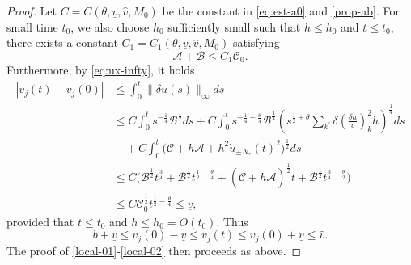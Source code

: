 \documentclass[a4paper,oneside,11pt]{article}
\numberwithin{equation}{section}
\begin{document}
\begin{proof}
Let \(C=C(\theta,\underline{v},\hat v,M_0)\) be the constant in \eqref{eq:est-a0}  and \eqref{prop-ab}. For small time $t_0$, we also choose \(h_{0}\) sufficiently small such that \(h\leq h_{0}\) and \(t\leq t_0\), there exists a constant $C_1=C_1(\theta,\underline{v},\hat v,M_0)$ satisfying
\[\mathscr{A}+\mathscr{B}\leq C_1\mathscr{C}_0.\]
Furthermore, by \eqref{eq:ux-infty}, it holds
\begin{equation}\label{eq:v-infty}
	\begin{aligned}
\left| {{v}_{j}\left( {t}\right)  - {v}_{j}\left( 0\right) }\right|  &\leq  \int_{0}^{{t}}\parallel {\delta u}\left( s\right) {\parallel }_{\infty }{ds}\\
&\leq  C\int_{0}^{t}  {s}^{-\frac{1}{4}}{\mathscr{B}}^{\frac{1}{2}}ds+C\int_{0}^{t}  {{s}^{-\frac{1}{4} - \frac{\theta }{4}}{\mathscr{B}}^{\frac{1}{4}}{\left( {s}^{\frac{1}{2} + \theta }\mathop{\sum }\limits_{k^{\prime}}\delta {\left( \frac{\delta u}{v}\right) }_{k}^{2}h\right) }^{\frac{1}{4}}}ds\\
&\quad +C\int_{0}^{t}\big(\tilde{\mathscr{C}}+ h\mathscr{A}+h^{2}\dot{u}_{\pm N_* }(t)^{2}\big)^{\frac12}ds\\
&\leq  C\Big({\mathscr{B}}^{\frac{1}{2}}{t}^{\frac{3}{4}}+  {\mathscr{B}}^{\frac{1}{2}}{t}^{\frac{1}{2} - \frac{\theta }{4}} + (\tilde{\mathscr{C}}+ h\mathscr{A})^{\frac{1}{2}}t+ {\mathscr{B}}^{\frac{1}{2}}{t}^{\frac{3}{4} - \frac{\theta }{2}} \Big)\\
&\leq  C{\mathscr{C}}_{0}^{\frac{1}{2}}t^{\frac{1}{2} - \frac{\theta }{4}}\leq \underline{v},
	\end{aligned}	
\end{equation}
provided that \(t\leq t_0\) and \(h\leq h_{0}=O(t_0)\). Thus
\begin{equation}\label{eq:v-infty1}
	b+\underline{v}\leq v_j(0)-\underline{v}\leq v_j(t)\leq v_j(0)+\underline{v}\leq \hat{v}.
\end{equation}
The proof of \eqref{local-01}-\eqref{local-02} then proceeds as above.


\end{proof}
\end{document}
